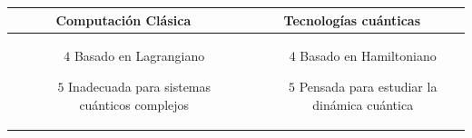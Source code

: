 \documentclass[a4paper,10pt]{article}
\begin{document}
\begin{multicols}{2}
\begin{tabular}{c|c}
\end{tabular}


\begin{tabular}{c|c}
Computación Clásica & Tecnologías cuánticas \\
\hline
\begin{minipage}{0.2\textwidth}
\begin{enumerate}
\item[$4$] Basado en Lagrangiano
\item[$5$] Inadecuada para sistemas cuánticos complejos
\end{enumerate}
\end{minipage}

&

\begin{minipage}{0.2\textwidth}
\begin{enumerate}
\item[$4$] Basado en Hamiltoniano
\item[$5$] Pensada para estudiar la dinámica cuántica
\end{enumerate}
\end{minipage}

\end{tabular}



\end{multicols}
\end{document}
